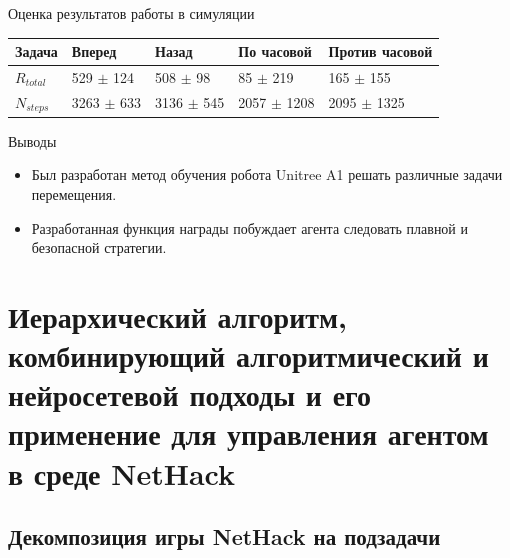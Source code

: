 \begin{frame}{Оценка результатов работы в симуляции}
\begin{table} [htbp]
\begin{threeparttable}
\begin{tabular}{| p{1cm} || p{2cm} | p{2cm} | p{2cm} |p{2cm} |}
            \hline
            \hline
            Задача & Вперед & Назад & По часовой & Против часовой \\
            \hline
            $R_{total}$ &	529 $\pm$ 124 &	508 $\pm$ 98 &	85 $\pm$ 219 &	165 $\pm$ 155 \\
            $N_{steps}$ & 3263 $\pm$ 633 &	3136 $\pm$ 545 &	2057 $\pm$ 1208 &	2095 $\pm$ 1325 \\
            \hline
            \hline
        \end{tabular}
    \end{threeparttable}
\end{table}
\end{frame}

\begin{frame}{Выводы}
\begin{itemize}
    \item Был разработан метод обучения робота Unitree A1 решать различные задачи перемещения.
    \item Разработанная функция награды побуждает агента следовать плавной и безопасной стратегии.
\end{itemize}
\end{frame}



\section{Иерархический алгоритм, комбинирующий алгоритмический и
нейросетевой подходы и его применение для управления агентом в среде NetHack}

\subsection{Декомпозиция игры NetHack на подзадачи}

